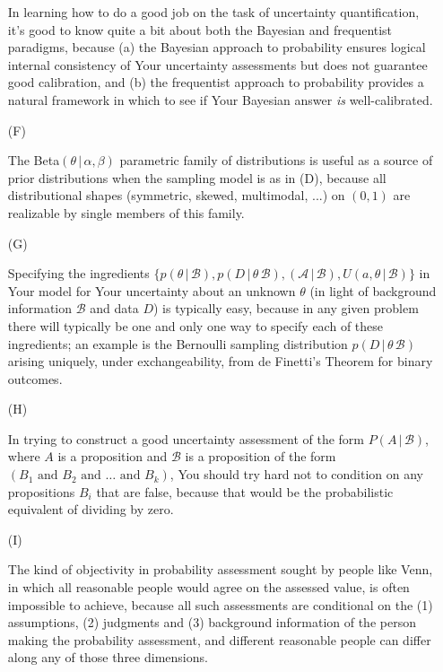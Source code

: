 \documentclass[12pt]{article}
\newcommand{\given}{\, | \,}
\newcommand{\given}{\, | \,}
\begin{document}
\begin{itemize}
In learning how to do a good job on the task of uncertainty quantification,
it's good to know quite a bit about both the Bayesian and frequentist
paradigms, because (a) the Bayesian approach to probability ensures logical
internal consistency of Your uncertainty assessments but does not guarantee
good calibration, and (b) the frequentist approach to probability provides
a natural framework in which to see if Your Bayesian answer \textit{is}
well-calibrated.

\item[(F)]

The Beta$( \theta \given \alpha, \beta )$ parametric family of distributions is
useful as a source of prior distributions when the sampling model is as in
(D), because all distributional shapes (symmetric, skewed, multimodal, ...)
on $( 0, 1 )$ are realizable by single members of this family.

\item[(G)]

Specifying the ingredients $\{ p ( \theta \given { \mathcal B } ), p ( D \given
\theta \, { \mathcal B } ), ( { \mathcal A \given { \mathcal B } } ), U ( a, \theta \given { \mathcal B } ) \}$ in Your model for Your uncertainty about an unknown $\theta$ (in light of background information $\mathcal B$ and data $D$) is typically easy, because in any given problem there will typically be one and only one way to specify each of these ingredients; an example is the Bernoulli sampling distribution $p ( D \given \theta \, { \mathcal B } )$ arising uniquely, under exchangeability, from de Finetti's Theorem for binary outcomes.

\item[(H)]

In trying to construct a good uncertainty assessment of the form $P ( A \given
\mathcal B )$, where $A$ is a proposition and $\mathcal B$ is a proposition
of the form $( B_1 \textrm{ and } B_2 \textrm{ and } \dots \textrm{ and }
B_k )$, You should try hard not to condition on any propositions $B_i$ that
are false, because that would be the probabilistic equivalent of dividing
by zero.  

\item[(I)]

The kind of objectivity in probability assessment sought by people like
Venn, in which all reasonable people would agree on the assessed value, is
often impossible to achieve, because all such assessments are conditional
on the (1) assumptions, (2) judgments and (3) background information of the
person making the probability assessment, and different reasonable people
can differ along any of those three dimensions.


\end{itemize}
\end{document}
